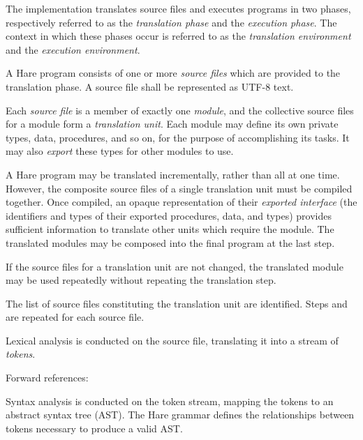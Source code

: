 
\specitem
The implementation translates source files and executes programs in two phases,
respectively referred to as the \textit{translation phase} and the
\textit{execution phase}. The context in which these phases occur is referred
to as the \textit{translation environment} and the \textit{execution
environment}.


\specsubitem
A Hare program consists of one or more \textit{source files} which are provided
to the translation phase. A source file shall be represented as \hbox{UTF-8}
text.

\specsubitem
Each \textit{source file} is a member of exactly one \textit{module}, and the
collective source files for a module form a \textit{translation unit}. Each
module may define its own private types, data, procedures, and so on, for the
purpose of accomplishing its tasks. It may also \textit{export} these types for
other modules to use.

\specsubitem
A Hare program may be translated incrementally, rather than all at one time.
However, the composite source files of a single translation unit must be
compiled together. Once compiled, an opaque representation of their
\textit{exported interface} (the identifiers and types of their exported
procedures, data, and types) provides sufficient information to translate other
units which require the module. The translated modules may be composed into the
final program at the last step.

\specsubitem
If the source files for a translation unit are not changed, the translated
module may be used repeatedly without repeating the translation step.


\specsubitem
The list of source files constituting the translation unit are identified. Steps
 and  are
repeated for each source file.

\specsubitem
Lexical analysis is conducted on the source file, translating it into a stream
of \textit{tokens}.

Forward references: 

\specsubitem
Syntax analysis is conducted on the token stream, mapping the tokens to an
abstract syntax tree (AST). The Hare grammar defines the relationships between
tokens necessary to produce a valid AST.

